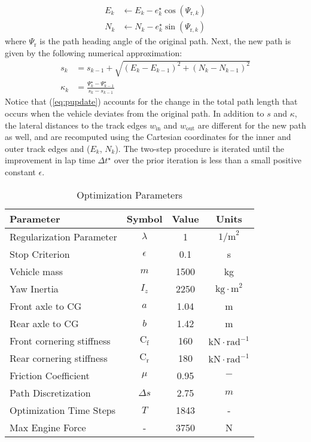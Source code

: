 \begin{subequations}
\begin{align}
	E_k &\gets E_k - e^\star_k\cos(\Psi_{\mathrm{r},k})\\
	N_k &\gets N_k - e^\star_k\sin(\Psi_{\mathrm{r},k})
\end{align}
\end{subequations}
where $\Psi_\mathrm{r}$ is the path heading angle of the original path. Next, the new path is given by the following numerical approximation:
 \begin{subequations}
 \label{eq:pupdate}
\begin{align}
	s_k &= s_{k-1} + \sqrt{(E_k - E_{k-1})^2 + (N_k - N_{k-1})^2}\\ 
	\kappa_k &= \frac{\Psi^\star_k - \Psi^\star_{k-1}}{s_k - s_{k-1}}
\end{align}
\end{subequations}
 Notice that (\ref{eq:pupdate}) accounts for the change in the total path length that occurs when the vehicle deviates from the original path.
 In addition to $s$ and $\kappa$, the lateral distances to the track edges $w_\mathrm{in}$ and $w_\mathrm{out}$ are different for the new path
 as well, and are recomputed using the Cartesian coordinates for
the inner and outer track edges and ($E_k$, $N_k$). The two-step procedure is iterated until the improvement in lap time $\Delta t^\star$ over the prior iteration is less than a small positive 
constant $\epsilon$.


\begin{table}
\label{tb:optprm}
\begin{center}
\small
\caption{Optimization Parameters}\label{tb:optprm}
\begin{tabular}{lccc}
Parameter & Symbol & Value & Units \\\hline
Regularization Parameter & $\lambda$ & 1 & $\mathrm{1/m}^2$\\
Stop Criterion           & $\epsilon $ & 0.1 & s \\
Vehicle mass & $m$ & 1500 & kg \\
Yaw Inertia & $I_z$ & 2250 & $\mathrm{kg \cdot m}^2$\\
Front axle to CG & $a$ & 1.04 & m\\
Rear axle to CG & $b$ & 1.42 & m\\
Front cornering stiffness & $\mathrm{C}_\mathrm{f}$ & 160 & $\mathrm{kN \cdot rad}^{-1}$ \\
Rear cornering stiffness & $\mathrm{C}_\mathrm{r}$ & 180 & $\mathrm{kN \cdot rad}^{-1}$ \\
Friction Coefficient     & $\mu $                  &  0.95 & $\mathrm{-} $ \\
Path Discretization      & $\Delta s$              & 2.75 & $m$\\
Optimization Time Steps  & $T       $              & 1843 & -  \\
Max Engine Force         & -                       & 3750 & N\\\hline
\end{tabular}
\end{center}
\end{table}

